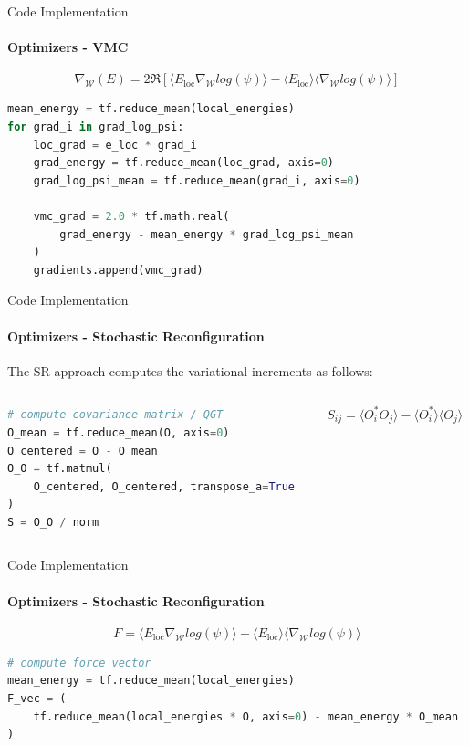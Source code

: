 \documentclass{beamer}
\begin{document}
\begin{frame}[fragile]{Code Implementation}
\framesubtitle{Optimizers - VMC}
$$
\nabla_{\mathcal{W}} \left(E\right)
    = 2 \mathfrak{R} \left[ \langle E_{\text{loc}} \nabla_{\mathcal{W}} log(\psi) \rangle - \langle E_{\text{loc}} \rangle \langle \nabla_{\mathcal{W}} log(\psi) \rangle \right]
$$

\begin{lstlisting}[language=Python, style=kaolstplain]
mean_energy = tf.reduce_mean(local_energies)
for grad_i in grad_log_psi:
	loc_grad = e_loc * grad_i
	grad_energy = tf.reduce_mean(loc_grad, axis=0)
	grad_log_psi_mean = tf.reduce_mean(grad_i, axis=0)

	vmc_grad = 2.0 * tf.math.real(
		grad_energy - mean_energy * grad_log_psi_mean
	)
	gradients.append(vmc_grad)
\end{lstlisting}

\end{frame}


\begin{frame}[fragile]{Code Implementation}
\framesubtitle{Optimizers - Stochastic Reconfiguration}
The SR approach computes the variational increments as follows:
\begin{columns}
\begin{column}{0.6\textwidth}
\begin{lstlisting}[language=Python, style=kaolstplain]
# compute covariance matrix / QGT
O_mean = tf.reduce_mean(O, axis=0)
O_centered = O - O_mean
O_O = tf.matmul(
	O_centered, O_centered, transpose_a=True
)
S = O_O / norm
\end{lstlisting}
\end{column}
\begin{column}{0.38\textwidth}
$$S_{ij} = \langle O_i^{*} O_j \rangle - \langle O_i^{*} \rangle \langle O_j \rangle$$
\end{column}
\end{columns}
\end{frame}

\begin{frame}[fragile]{Code Implementation}
\framesubtitle{Optimizers - Stochastic Reconfiguration}
$$F = \langle E_{\text{loc}} \nabla_{\mathcal{W}} log(\psi) \rangle - \langle E_{\text{loc}} \rangle \langle \nabla_{\mathcal{W}} log(\psi) \rangle$$

\begin{lstlisting}[language=Python, style=kaolstplain]
# compute force vector
mean_energy = tf.reduce_mean(local_energies)
F_vec = (
	tf.reduce_mean(local_energies * O, axis=0) - mean_energy * O_mean
)
\end{lstlisting}
\end{frame}
\end{document}
